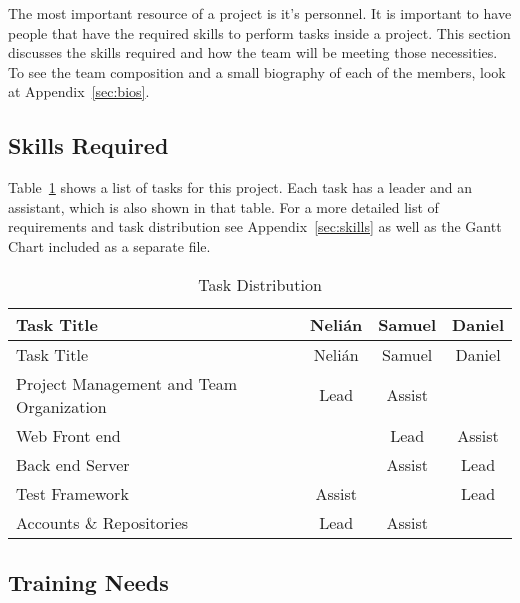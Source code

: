 
The most important resource of a project is it's personnel. It is important to
have people that have the required skills to perform tasks inside a  project.
This section discusses the skills required and how  the team will be meeting
those necessities. To see the team composition and a small biography of each of
the members, look at Appendix~\ref{sec:bios}.

\subsection{Skills Required}

Table~\ref{tasks} shows a list of tasks for this project. Each task has a leader
and an assistant, which is also shown in that table. For a more detailed list of
requirements and task distribution see Appendix~\ref{sec:skills} as well as the
Gantt Chart included as a separate file.

\begin{center}
\setlength{\extrarowheight}{1.5pt}
  \begin{longtable}{|m{3.25in}|c|c|c|}
 \caption{Task Distribution \label{tasks}} \\
   \hline
  
  \centering Task Title & Nelián & Samuel & Daniel \\
  \hline \hline \endfirsthead
  
     \hline

	\centering Task Title & Nelián & Samuel & Daniel \\  
	\hline \hline \endhead
  
  \endfoot  
  
  Project Management and Team Organization & Lead & Assist & \\ \hline
  Web Front end & & Lead & Assist \\ \hline
  Back end Server & & Assist & Lead \\ \hline
  Test Framework & Assist & & Lead \\ \hline
  Accounts \& Repositories & Lead & Assist & \\ \hline
   \end{longtable}
\end{center}

\subsection{Training Needs}

